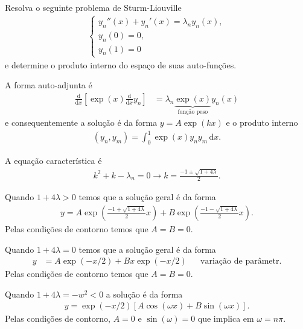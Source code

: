\documentclass[a4paper,12pt, leqno, answers]{exam}
\begin{document}
\begin{questions}
    \question[E de 2008] Resolva o seguinte problema de Sturm-Liouville
    \begin{align*}
        \begin{cases}
            y_n''(x) + y_n'(x) = \lambda_n y_n(x), \\
            y_n(0) = 0, \\
            y_n(1) = 0
        \end{cases}
    \end{align*}
    e determine o produto interno do espa\c{c}o de suas auto-fun\c{c}\~{o}es.
    \begin{solution}
        A forma auto-adjunta \'{e}
        \begin{align*}
            \frac{\mathrm{d}}{\mathrm{d}x}\left[ \exp(x) \frac{\mathrm{d}}{\mathrm{d}x}y_n \right] &= \lambda_n \underbrace{\exp(x)}_{\text{fun\c{c}\~{a}o peso}} y_n(x)
        \end{align*}
        e consequentemente a solu\c{c}\~{a}o \'{e} da forma $y = A \exp(k x)$ e o produto interno
        \begin{align*}
            (y_n, y_m) = \int_0^1 \exp(x) y_n y_m \,\mathrm{d}x.
        \end{align*}

        A equa\c{c}\~{a}o caracter\'{i}stica \'{e}
        \begin{align*}
            k^2 + k - \lambda_n = 0 \to k = \frac{-1 \pm \sqrt{1 + 4 \lambda}}{2}.
        \end{align*}

        Quando $1 + 4 \lambda > 0$ temos que a solu\c{c}\~{a}o geral \'{e} da forma
        \begin{align*}
            y = A \exp\left( \frac{-1 + \sqrt{1 + 4\lambda}}{2} x \right) + B \exp\left( \frac{-1 - \sqrt{1 + 4 \lambda}}{2} x \right).
        \end{align*}
        Pelas condi\c{c}\~{o}es de contorno temos que $A = B = 0$.

        Quando $1 + 4 \lambda = 0$ temos que a solu\c{c}\~{a}o geral \'{e} da forma
        \begin{align*}
            y &= A \exp(- x/2) + B x \exp(-x/2) && \text{varia\c{c}\~{a}o de par\^{a}metr}.
        \end{align*}
        Pelas condi\c{c}\~{o}es de contorno temos que $A = B = 0$.

        Quando $1 + 4 \lambda = - w^2 < 0$ a solu\c{c}\~{a}o \'{e} da forma
        \begin{align*}
            y = \exp(-x/2) \left[ A \cos(\omega x) + B \sin(\omega x) \right].
        \end{align*}
        Pelas condi\c{c}\~{o}es de contorno, $A = 0$ e $\sin(\omega) = 0$ que implica em $\omega = n \pi$.


\end{solution}
\end{questions}
\end{document}
